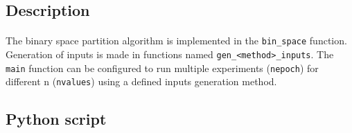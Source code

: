 \documentclass[letterpaper]{article}
\begin{document}
\subsection{Description}

\paragraph{}

The binary space partition algorithm is implemented in the \texttt{bin\_space} function.
Generation of inputs is made in functions named \texttt{gen\_<method>\_inputs}.
The \texttt{main} function can be configured to run multiple experiments (\texttt{nepoch})
for different n (\texttt{nvalues}) using a defined inputs generation method.


\subsection{Python script}
\end{document}
